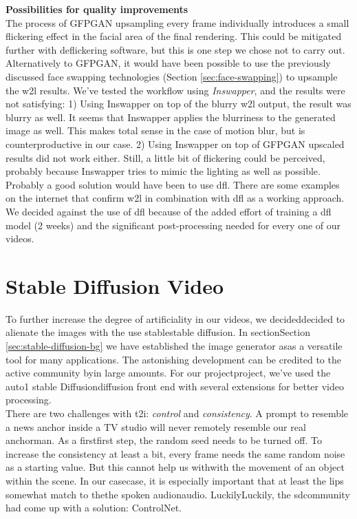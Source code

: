 \documentclass[
  a4paper,  %
  twoside,  %
  bibliography=totoc,
  headsepline,
  cleardoublepage=empty,
  parskip=half,
  draft=false
]{scrbook}
\begin{document}
\textbf{Possibilities for quality improvements} \\
The process of GFPGAN upsampling every frame individually introduces a small flickering effect in the facial area of the final rendering. This could be mitigated further with deflickering software, but this is one step we chose not to carry out. \\ 
Alternatively to GFPGAN, it would have been possible to use the previously discussed face swapping technologies (Section \ref{sec:face-swapping}) to upsample the \gls{w2l} results. We've tested the workflow using \textit{Inswapper}, and the results were not satisfying: 1) Using Inswapper on top of the blurry \gls{w2l} output, the result was blurry as well. It seems that Inswapper applies the blurriness to the generated image as well. This makes total sense in the case of motion blur, but is counterproductive in our case. 2) Using Inswapper on top of GFPGAN upscaled results did not work either. Still, a little bit of flickering could be perceived, probably because Inswapper tries to mimic the lighting as well as possible. \\
Probably a good solution would have been to use \gls{dfl}. There are some examples on the internet that confirm \gls{w2l} in combination with \gls{dfl} as a working approach. We decided against the use of \gls*{dfl} because of the added effort of training a \gls{dfl} model (2 weeks) and the significant post-processing needed for every one of our videos. 


\section{Stable Diffusion Video}
\label{sec:sd-video}
To further increase the degree of artificiality in our videos, we decideddecided to alienate the images with the use stablestable diffusion. In sectionSection \ref{sec:stable-diffusion-bg} we have established the image generator asas a versatile tool for many applications. The astonishing development can be credited to the active community byin large amounts. For our projectproject, we've used the \gls{auto1} stable Diffusiondiffusion front end with several extensions for better video processing. \\
There are two challenges with \gls{t2i}: \textit{control} and \textit{consistency}. A prompt to resemble a news anchor inside a TV studio will never remotely resemble our real anchorman. As a firstfirst step, the random seed needs to be turned off. To increase the consistency at least a bit, every frame needs the same random noise as a starting value. But this cannot help us withwith the movement of an object within the scene. In our casecase, it is especially important that at least the lips somewhat match to thethe spoken audionaudio. LuckilyLuckily, the \gls{sd}community had come up with a solution: ControlNet.
\end{document}
